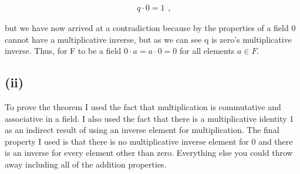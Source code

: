 \documentclass{article}
\begin{document}
    \[
      \begin{split}
       q \cdot 0 = 1
      \end{split},
    \]

    but we have now arrived at a contradiction because by the properties of a field 0 cannot have a multiplicative inverse, but as we can see q is zero's multiplicative inverse. Thus, for F to be a field $0 \cdot a = a \cdot 0 = 0$ for all elements $a \in F$.
  
  \subsection*{(ii)}
      To prove the theorem I used the fact that multiplication is commutative and associative in a field. I also used the fact that there is a multiplicative identity 1 as an indirect result of using an inverse element for multiplication. The final property I used is that there is no multiplicative inverse element for 0 and there is an inverse for every element other than zero. Everything else you could throw away including all of the addition properties.
\end{document}
